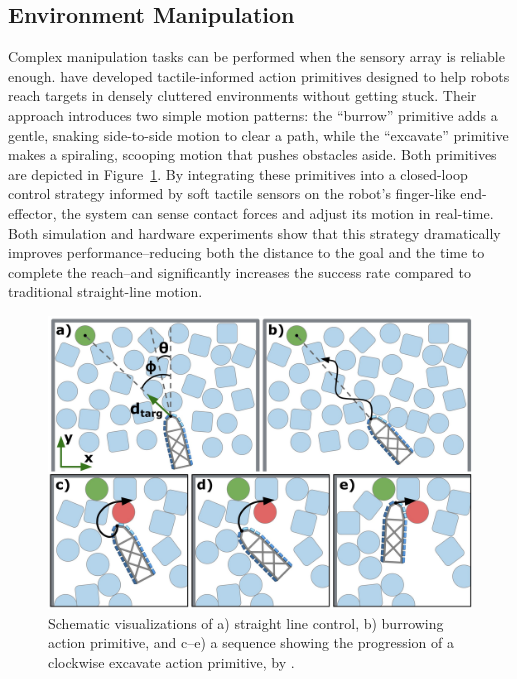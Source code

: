\subsection{Environment Manipulation}
Complex manipulation tasks can be performed when the sensory array is reliable enough.
\textcite{Brouwer2024TactileInformedAP} have developed tactile-informed action primitives designed to help robots reach targets in densely cluttered environments without getting stuck.
Their approach introduces two simple motion patterns: the \enquote{burrow} primitive adds a gentle, snaking side-to-side motion to clear a path, while the \enquote{excavate} primitive makes a spiraling, scooping motion that pushes obstacles aside.
Both primitives are depicted in Figure~\ref{fig:environment-manipulation}.
By integrating these primitives into a closed-loop control strategy informed by soft tactile sensors on the robot's finger-like end-effector, the system can sense contact forces and adjust its motion in real-time.
Both simulation and hardware experiments show that this strategy dramatically improves performance--reducing both the distance to the goal and the time to complete the reach--and significantly increases the success rate compared to traditional straight-line motion.

\begin{figure}[htb]
    \centering
    \includegraphics[width=\textwidth]{figures/environment-manipulation}
    \caption{Schematic visualizations of a) straight line control, b) burrowing action primitive, and c--e) a sequence showing the progression of a clockwise excavate action primitive, by \textcite{Brouwer2024TactileInformedAP}.}
    \label{fig:environment-manipulation}
\end{figure}